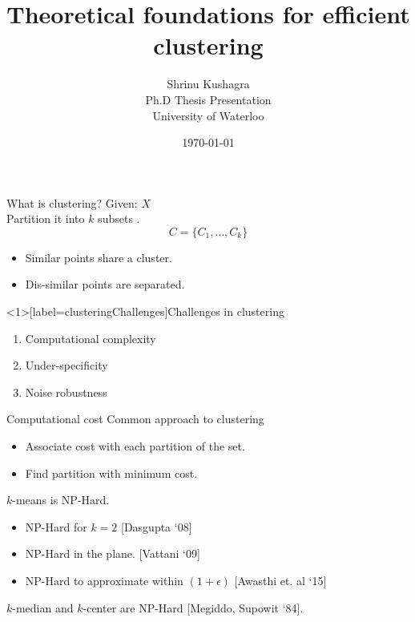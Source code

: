 \documentclass{beamer}
\title[Efficient Clustering]{Theoretical foundations for efficient clustering}
\author[S. Kushagra]{
Shrinu Kushagra\\
\vspace{30pt}Ph.D Thesis Presentation\\
University of Waterloo
}
\date{\today}
\begin{document}
\begin{frame}
  \titlepage
\end{frame}

\begin{frame}{What is clustering?}
	Given: $X$\\
	\vspace{10pt}Partition it into $k$ subsets .$$C = \{C_1, \ldots, C_k\}$$
	\begin{itemize}
		\item Similar points share a cluster.
		\item Dis-similar points are separated.
	\end{itemize}
\end{frame}

\begin{frame}<1>[label=clusteringChallenges]{Challenges in clustering}
	\begin{enumerate}
		 \item Computational complexity
		\onslide<2> \vspace{20pt}\item  Under-specificity
		\onslide<3>\vspace{20pt}\item Noise robustness
	\end{enumerate}
\end{frame}

\begin{frame}{Computational cost}
	Common approach to clustering
	\begin{itemize}
		\item Associate cost with each partition of the set.
		\item Find partition with minimum cost.
	\end{itemize}

	\vspace{20pt}$k$-means is NP-Hard.
	\begin{itemize}
		\item NP-Hard for $k=2$ \alert{[Dasgupta `08]}
		\vspace{0pt}\item NP-Hard in the plane. \alert{[Vattani `09]}
		\vspace{0pt}\item NP-Hard to approximate within $(1+\epsilon)$ \alert{[Awasthi et. al `15]}
	\end{itemize} 
	
	\vspace{20pt}$k$-median and $k$-center are NP-Hard \alert{[Megiddo, Supowit `84]}.
\end{frame}
\end{document}
